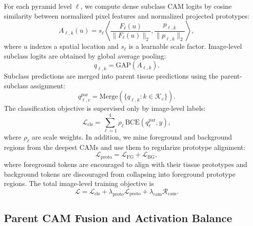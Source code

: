 For each pyramid level $\ell$, we compute dense subclass CAM logits by cosine similarity between normalized pixel features and normalized projected prototypes:
\begin{equation}
    A_{\ell,k}(u)
    =
    s_{\ell}
    \left\langle
    \frac{F_{\ell}(u)}{\|F_{\ell}(u)\|_2},
    \frac{p_{\ell,k}}{\|p_{\ell,k}\|_2}
    \right\rangle ,
    \label{eq:subclass_cam}
\end{equation}
where $u$ indexes a spatial location and $s_{\ell}$ is a learnable scale factor. Image-level subclass logits are obtained by global average pooling:
\begin{equation}
    q_{\ell,k} = \mathrm{GAP}(A_{\ell,k}).
\end{equation}
Subclass predictions are merged into parent tissue predictions using the parent-subclass assignment:
\begin{equation}
    q_{\ell,c}^{\mathrm{par}}
    =
    \mathrm{Merge}\left(\{q_{\ell,k}: k \in \mathcal{K}_c\}\right).
\end{equation}
The classification objective is supervised only by image-level labels:
\begin{equation}
    \mathcal{L}_{\mathrm{cls}}
    =
    \sum_{\ell=1}^{4}
    \rho_{\ell}
    \,
    \mathrm{BCE}\!\left(
        q_{\ell}^{\mathrm{par}}, y
    \right),
    \label{eq:cls_loss}
\end{equation}
where $\rho_{\ell}$ are scale weights. In addition, we mine foreground and background regions from the deepest CAMs and use them to regularize prototype alignment:
\begin{equation}
    \mathcal{L}_{\mathrm{proto}}
    =
    \mathcal{L}_{\mathrm{FG}}
    +
    \mathcal{L}_{\mathrm{BG}},
    \label{eq:proto_loss}
\end{equation}
where foreground tokens are encouraged to align with their tissue prototypes and background tokens are discouraged from collapsing into foreground prototype regions. The total image-level training objective is
\begin{equation}
    \mathcal{L}
    =
    \mathcal{L}_{\mathrm{cls}}
    +
    \lambda_{\mathrm{proto}}\mathcal{L}_{\mathrm{proto}}
    +
    \lambda_{\mathrm{cam}}\mathcal{R}_{\mathrm{cam}} .
    \label{eq:total_loss}
\end{equation}

\subsection{Parent CAM Fusion and Activation Balance}
\label{subsec:activation_balance}

